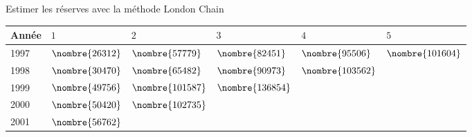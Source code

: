 \begin{exemple}
  Estimer les réserves avec la méthode London Chain
  \begin{center}
    \begin{tabular}{|l|l l l l l|}\hline
      Année & $1$ & $2$ & $3$ & $4$ & $5$  \\ \hline
      1997 &$\nombre{26312}$&	$\nombre{57779}$&	$\nombre{82451}$&	$\nombre{95506}$&	$\nombre{101604}$\\
      1998 &$\nombre{30470}$&	$\nombre{65482}$&	$\nombre{90973}$&	$\nombre{103562}$&	\\
      1999 &$\nombre{49756}$&	$\nombre{101587}$&	$\nombre{136854}$&	&	\\
      2000 &$\nombre{50420}$&	$\nombre{102735}$&	& &	\\
      2001 &$\nombre{56762}$&	&&&\\ \hline
    \end{tabular}
  \end{center}


\end{exemple}
